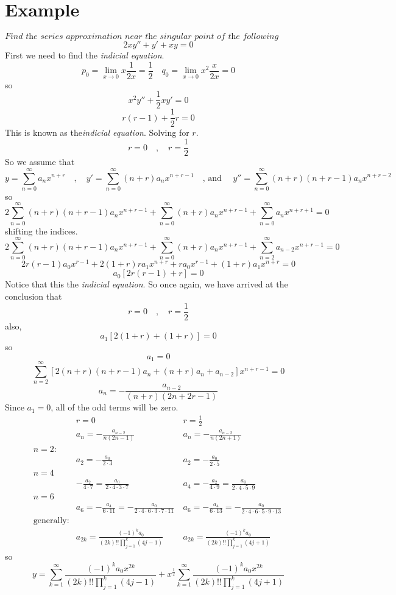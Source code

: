 \documentclass[font =22]{report}
\begin{document}
\section*{Example}
\[
\textit{Find the series approximation near the singular point of the following differential equation.}
\]
\[
2xy''+y'+xy = 0
\]
First we need to find the \textit{indicial equation}.
\[
p_0 = \lim_{x \to 0}x\frac{1}{2x} = \frac{1}{2} \quad q_0 = \lim_{x \to 0} x^2\frac{x}{2x} = 0
\]
so 
\[
x^2y'' +\frac{1}{2}xy' = 0
\]
\[
r(r-1)+\frac{1}{2}r= 0
\]
This is known as the\textit{indicial equation}. Solving for $r$. 
\[
r=0 \quad,\quad r = \frac{1}{2}
\]
So we assume that 
\[
y = \sum_{n=0}^\infty a_nx^{n+r}\quad,\quad y' = \sum_{n=0}^\infty (n+r)a_nx^{n+r-1} \quad \text{, and } \quad y'' = \sum_{n=0}^\infty (n+r)(n+r-1)a_nx^{n+r-2}
\]
so 
\[
2\sum_{n=0}^\infty (n+r)(n+r-1)a_nx^{n+r-1} + \sum_{n=0}^\infty (n+r)a_nx^{n+r-1} + \sum_{n=0}^\infty a_nx^{n+r+1} = 0
\]
shifting the indices.
\[
2\sum_{n=0}^\infty (n+r)(n+r-1)a_nx^{n+r-1} + \sum_{n=0}^\infty (n+r)a_nx^{n+r-1} + \sum_{n=2}^\infty a_{n-2}x^{n+r-1} = 0
\] 
\[
2r(r-1)a_0x^{r-1} + 2(1+r)ra_1x^{n+r}+ra_0x^{r-1}+(1+r)a_1x^{n+r} = 0
\]
\[
a_0[2r(r-1)+r] = 0
\]
Notice that this the \textit{indicial equation}. So once again, we have arrived at the conclusion that 
\[
r=0 \quad,\quad r = \frac{1}{2}
\]
also,
\[
a_1[2(1+r)+(1+r)]= 0
\]
so
\[
a_1 = 0
\]
\[
\sum_{n=2}^\infty[2(n+r)(n+r-1)a_n + (n+r)a_n + a_{n-2}]x^{n+r-1}= 0
\]
\[
a_n = -\frac{a_{n-2}}{(n+r)(2n+2r-1)}
\]
Since $a_1=0$, all of the odd terms will be zero.
\begin{align*}
&r=0 \ &r=\frac{1}{2} \ 
\\
&a_n = -\frac{a_{n-2}}{n(2n-1)} \ &a_n = -\frac{a_{n-2}}{n(2n+1)} \
\\
 n=2:
\\
&a_2 = -\frac{a_0}{2\cdot3} \ &a_2 = -\frac{a_0}{2\cdot5} \
\\
n = 4
\\
&-\frac{a_2}{4\cdot7} = \frac{a_0}{2\cdot4\cdot3\cdot7} \ &a_4 = -\frac{a_2}{4\cdot9}=\frac{a_0}{2\cdot4\cdot5\cdot9} \
\\
n=6
\\
&a_6 = -\frac{a_4}{6\cdot11} = -\frac{a_0}{2\cdot4\cdot6\cdot3\cdot7\cdot11} \ &a_6=-\frac{a_4}{6\cdot13} = -\frac{a_0}{2\cdot4\cdot6\cdot5\cdot9\cdot13}\
\\
\text{generally:}
\\
&a_{2k} = \frac{(-1)^ka_0}{(2k)!!\prod_{j=1}^k(4j-1)} \ &a_{2k} = \frac{(-1)^ka_0}{(2k)!!\prod_{j=1}^k(4j+1)} \
\end{align*} 
so 
\[
y = \sum_{k=1}^\infty   \frac{(-1)^ka_0x^{2k}}{(2k)!!\prod_{j=1}^k(4j-1)} + x^{\frac{1}{2}}\sum_{k=1}^\infty  \frac{(-1)^ka_0x^{2k}}{(2k)!!\prod_{j=1}^k(4j+1)}
\]
\end{document}
